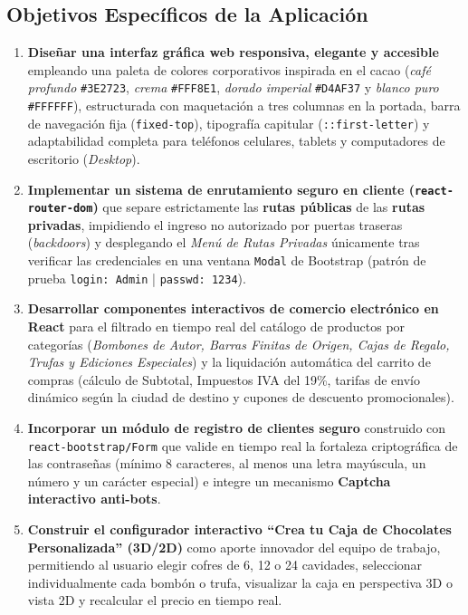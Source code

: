 \documentclass[12pt,letterpaper]{article}
\begin{document}
\subsection{Objetivos Específicos de la Aplicación}
\begin{enumerate}[leftmargin=1.2cm]
  \item \textbf{Diseñar una interfaz gráfica web responsiva, elegante y accesible} empleando una paleta de colores corporativos inspirada en el cacao (\textit{café profundo} \texttt{\#3E2723}, \textit{crema} \texttt{\#FFF8E1}, \textit{dorado imperial} \texttt{\#D4AF37} y \textit{blanco puro} \texttt{\#FFFFFF}), estructurada con maquetación a tres columnas en la portada, barra de navegación fija (\texttt{fixed-top}), tipografía capitular (\texttt{::first-letter}) y adaptabilidad completa para teléfonos celulares, tablets y computadores de escritorio (\textit{Desktop}).
  \item \textbf{Implementar un sistema de enrutamiento seguro en cliente (\texttt{react-router-dom})} que separe estrictamente las \textbf{rutas públicas} de las \textbf{rutas privadas}, impidiendo el ingreso no autorizado por puertas traseras (\textit{backdoors}) y desplegando el \textit{Menú de Rutas Privadas} únicamente tras verificar las credenciales en una ventana \texttt{Modal} de Bootstrap (patrón de prueba \texttt{login: Admin} | \texttt{passwd: 1234}).
  \item \textbf{Desarrollar componentes interactivos de comercio electrónico en React} para el filtrado en tiempo real del catálogo de productos por categorías (\textit{Bombones de Autor, Barras Finitas de Origen, Cajas de Regalo, Trufas y Ediciones Especiales}) y la liquidación automática del carrito de compras (cálculo de Subtotal, Impuestos IVA del 19\%, tarifas de envío dinámico según la ciudad de destino y cupones de descuento promocionales).
  \item \textbf{Incorporar un módulo de registro de clientes seguro} construido con \texttt{react-bootstrap/Form} que valide en tiempo real la fortaleza criptográfica de las contraseñas (mínimo 8 caracteres, al menos una letra mayúscula, un número y un carácter especial) e integre un mecanismo \textbf{Captcha interactivo anti-bots}.
  \item \textbf{Construir el configurador interactivo ``Crea tu Caja de Chocolates Personalizada'' (3D/2D)} como aporte innovador del equipo de trabajo, permitiendo al usuario elegir cofres de 6, 12 o 24 cavidades, seleccionar individualmente cada bombón o trufa, visualizar la caja en perspectiva 3D o vista 2D y recalcular el precio en tiempo real.
\end{enumerate}
\end{document}
